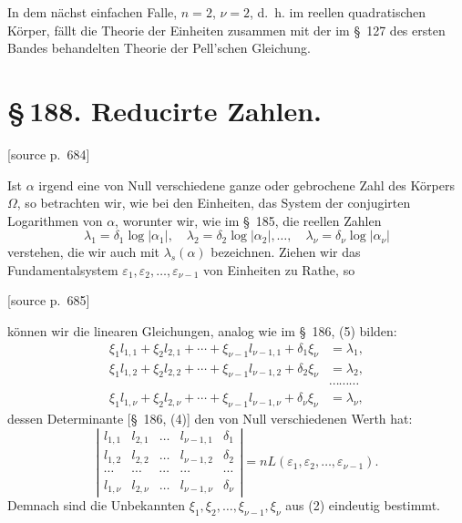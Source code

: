 \documentclass[11pt]{article}
\newcommand{\srcpage}[1]{\par\medskip\noindent\textsf{[source p.~#1]}\par\smallskip}
\begin{document}
In dem nächst einfachen Falle, $n=2$, $\nu=2$, d.~h. im reellen quadratischen Körper, fällt die Theorie der Einheiten zusammen mit der im \S~127 des ersten Bandes behandelten Theorie der Pell'schen Gleichung.


\section*{\S\,188. Reducirte Zahlen.}

\srcpage{684}
Ist $\alpha$ irgend eine von Null verschiedene ganze oder gebrochene Zahl des Körpers $\Omega$, so betrachten wir, wie bei den Einheiten, das System der conjugirten Logarithmen von $\alpha$, worunter wir, wie im \S~185, die reellen Zahlen
\begin{equation}
\lambda_1=\delta_1\log|\alpha_1|,\quad
\lambda_2=\delta_2\log|\alpha_2|,\ldots,\quad
\lambda_\nu=\delta_\nu\log|\alpha_\nu|
\tag{1}
\end{equation}
verstehen, die wir auch mit $\lambda_s(\alpha)$ bezeichnen. Ziehen wir das Fundamentalsystem $\varepsilon_1,\varepsilon_2,\ldots,\varepsilon_{\nu-1}$ von Einheiten zu Rathe, so

\srcpage{685}
können wir die linearen Gleichungen, analog wie im \S~186, (5) bilden:
\begin{equation}
\begin{aligned}
\xi_1l_{1,1}+\xi_2l_{2,1}+\cdots+\xi_{\nu-1}l_{\nu-1,1}+\delta_1\xi_\nu&=\lambda_1,\\
\xi_1l_{1,2}+\xi_2l_{2,2}+\cdots+\xi_{\nu-1}l_{\nu-1,2}+\delta_2\xi_\nu&=\lambda_2,\\
&\cdots\cdots\cdots\\
\xi_1l_{1,\nu}+\xi_2l_{2,\nu}+\cdots+\xi_{\nu-1}l_{\nu-1,\nu}+\delta_\nu\xi_\nu&=\lambda_\nu,
\end{aligned}
\tag{2}
\end{equation}
dessen Determinante [\S~186, (4)] den von Null verschiedenen Werth hat:
\begin{equation}
\left|
\begin{array}{ccccc}
l_{1,1}&l_{2,1}&\ldots&l_{\nu-1,1}&\delta_1\\
l_{1,2}&l_{2,2}&\ldots&l_{\nu-1,2}&\delta_2\\
\cdots&\cdots&\cdots&\cdots&\cdots\\
l_{1,\nu}&l_{2,\nu}&\ldots&l_{\nu-1,\nu}&\delta_\nu
\end{array}
\right|=nL(\varepsilon_1,\varepsilon_2,\ldots,\varepsilon_{\nu-1}).
\tag{3}
\end{equation}
Demnach sind die Unbekannten $\xi_1,\xi_2,\ldots,\xi_{\nu-1},\xi_\nu$ aus (2) eindeutig bestimmt.
\end{document}
